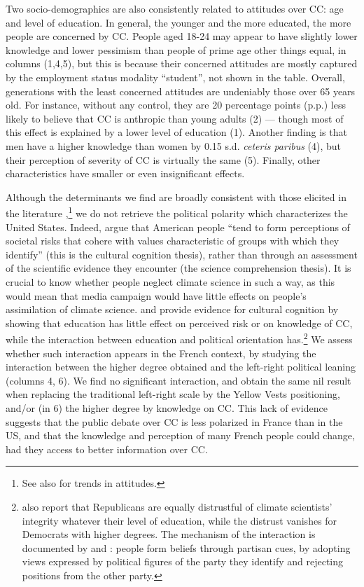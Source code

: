 \documentclass[english,5p,authoryear]{elsarticle}
\begin{document}
Two socio-demographics are also consistently related to attitudes over CC: age and level of education. In general, the younger and the more educated, the more people are concerned by CC. People aged 18-24 may appear to have slightly lower knowledge and lower pessimism than people of prime age other things equal, in columns (1,4,5), but this is because their concerned attitudes are mostly captured by the employment status modality ``student'', not shown in the table. Overall, generations with the least concerned attitudes are undeniably those over 65 years old. For instance, without any control, they are 20 percentage points (p.p.) less likely to believe that CC is anthropic than young adults (2) --- though most of this effect is explained by a lower level of education (1). Another finding is that men have a higher knowledge than women by 0.15 s.d. \textit{ceteris paribus} (4), but their perception of severity of CC is virtually the same (5). Finally, other characteristics have smaller or even insignificant effects. 

Although the determinants we find are broadly consistent with those elicited in the literature \citep{upham_public_2009,whitmarsh_scepticism_2011, ademe_representations_2018},\footnote{See also \citet{capstick_international_2015} for trends in attitudes.} we do not retrieve the political polarity which characterizes the United States. Indeed, \citet{kahan_polarizing_2012} argue that American people ``tend to form perceptions of societal risks that cohere with values characteristic of groups with which they identify'' (this is the cultural cognition thesis), rather than through an assessment of the scientific evidence they encounter (the science comprehension thesis). It is crucial to know whether people neglect climate science in such a way, as this would mean that media campaign would have little effects on people's assimilation of climate science. \citet{kahan_polarizing_2012} and \citet{mccright_politicization_2011} provide evidence for cultural cognition by showing that education has little effect on perceived risk or on knowledge of CC, while the interaction between education and political orientation has.\footnote{\citet{funk_politics_2016} also report that Republicans are equally distrustful of climate scientists' integrity whatever their level of education, while the distrust vanishes for Democrats with higher degrees. The mechanism of the interaction is documented by \citet{ehret_partisan_2018} and \citet{van_boven_psychological_2018}: people form beliefs through partisan cues, by adopting views expressed by political figures of the party they identify and rejecting positions from the other party.} We assess whether such interaction appears in the French context, by studying the interaction between the higher degree obtained and the left-right political leaning (columns 4, 6). We find no significant interaction, and obtain the same nil result when replacing the traditional left-right scale by the Yellow Vests positioning, and/or (in 6) the higher degree by knowledge on CC. This lack of evidence suggests that the public debate over CC is less polarized in France than in the US, and that the knowledge and perception of many French people could change, had they access to better information over CC. 
\end{document}
